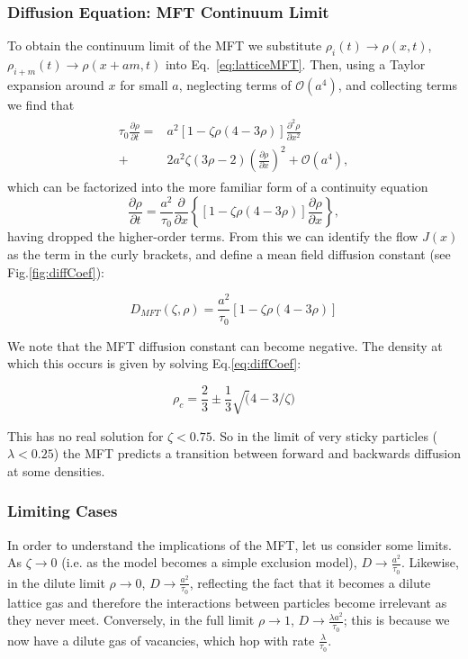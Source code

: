 \documentclass[
reprint, amsmath,amssymb, aps,
]{revtex4-1}
\newcommand{\partDeriv}[2]{\frac{\partial #1}{\partial #2}}
\begin{document}
\subsubsection{Diffusion Equation: MFT Continuum Limit}
 To obtain the continuum limit of the MFT we substitute $\rho_i(t)
 \rightarrow \rho(x, t)$, $\rho_{i+m}(t) \rightarrow \rho(x + am, t)$
 into Eq.~\ref{eq:latticeMFT}.  Then, using a Taylor expansion around $x$ for
 small $a$, neglecting terms of $\mathcal{O}(a^4)$, and collecting
 terms we find that
\begin{align}
 \begin{split}
  \tau_0 \partDeriv{\rho}{t} =& a^2 \left[ 1-\zeta \rho (4-3\rho)  \right] \partDeriv{^2 \rho}{x^2} 
\\
  +& 2 a^2 \zeta (3\rho-2) \left(\partDeriv{\rho}{x}\right)^2 + \mathcal{O}(a^4) ,
 \end{split}
\end{align}
which can be factorized into the more familiar form of a continuity equation
\begin{equation}
\label{eq:contPDE}
 \partDeriv{\rho}{t} = \frac{a^2}{\tau_0} \partDeriv{}{x} \left\{ \left[1 - \zeta \rho\left(4-3\rho\right) \right] \partDeriv{\rho}{x} \right\},
\end{equation}
having dropped the higher-order terms.  From this we can identify the
flow $J(x)$ as the term in the curly brackets, and define a mean field
diffusion constant (see Fig.\ref{fig:diffCoef}):

\begin{equation} D_{MFT}(\zeta,\rho) =  \frac{a^2}{\tau_0} \left[ 1 - \zeta \rho\left(4-3\rho\right) \right ] \label{eq:diffCoef} \end{equation}

We note that the MFT diffusion constant can become negative. 
The density at
which this occurs is given by solving Eq.\ref{eq:diffCoef}:

\[\rho_c=\frac{2}{3} \pm \frac{1}{3} \sqrt(4-3/\zeta)\]

This has no real solution for $\zeta<0.75$.  So in the limit
of very sticky particles ($\lambda<0.25$) the MFT predicts a
transition between forward and backwards diffusion at some densities.  


\subsubsection{Limiting Cases}

In order to understand the implications of the MFT, let us consider
some limits. As $\zeta \rightarrow 0$ (i.e. as the model becomes a
simple exclusion model), $D \rightarrow \frac{a^2}{\tau_0}$. Likewise,
in the dilute limit $\rho \rightarrow 0$, $D \rightarrow \frac{
  a^2}{\tau_0}$, reflecting the fact that it becomes a dilute lattice
gas and therefore the interactions between particles become irrelevant
as they never meet.  Conversely, in the full limit $\rho \rightarrow
1$, $D \rightarrow \frac{\lambda a^2}{\tau_0}$; this is because we now
have a dilute gas of vacancies, which hop with rate
$\frac{\lambda}{\tau_0}$.  
\end{document}
